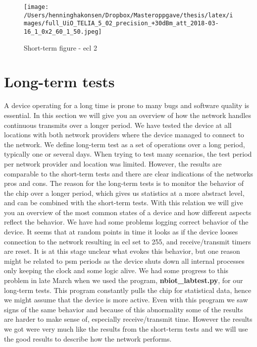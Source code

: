 \documentclass[USenglish]{ifimaster}  %
\begin{document}
\begin{figure}[H]
  \centering
  \texttt{[image: /Users/henninghakonsen/Dropbox/Masteroppgave/thesis/latex/images/full\_UiO\_TELIA\_5\_02\_precision\_+30dBm\_att\_2018-03-16\_1\_0x2\_60\_1\_50.jpeg]}
  \caption{Short-term figure - \acrshort{ecl} 2}
  \label{figure:1x60_UIO_TELIA_ECL_2}
\end{figure}

\section{Long-term tests} \label{section:longtermtest}
A device operating for a long time is prone to many bugs and software quality is essential. In this section we will give you an overview of how the network handles continuous transmits over a longer period. We have tested the device at all locations with both network providers where the device managed to connect to the network. We define long-term test as a set of operations over a long period, typically one or several days. When trying to test many scenarios, the test period per network provider and location was limited. However, the results are comparable to the short-term tests and there are clear indications of the networks pros and cons. The reason for the long-term tests is to monitor the behavior of the chip over a longer period, which gives us statistics at a more abstract level, and can be combined with the short-term tests. With this relation we will give you an overview of the most common states of a device and how different aspects reflect the behavior. We have had some problems logging correct behavior of the device. It seems that at random points in time it looks as if the device looses connection to the network resulting in \acrshort{ecl} set to 255, and receive/transmit timers are reset. It is at this stage unclear what evokes this behavior, but one reason might be related to \acrshort{psm} periods as the device shuts down all internal processes only keeping the clock and some logic alive. We had some progress to this problem in late March when we used the program, \textbf{nbiot\_labtest.py}, for our long-term tests. This program constantly pulls the chip for statistical data, hence we might assume that the device is more active. Even with this program we saw signs of the same behavior and because of this abnormality some of the results are harder to make sense of, especially receive/transmit time. However the results we got were very much like the results from the short-term tests and we will use the good results to describe how the network performs.
\end{document}

